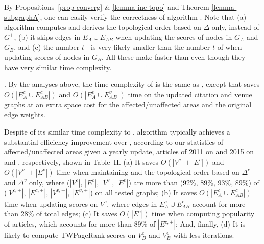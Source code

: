 
By Propositions~\ref{prop-converg} \& \ref{lemma-inc-topo} and Theorem \ref{lemma-subgraphA}, one can easily verify the correctness of algorithm \inctwprscc.
%
Note that  (a) algorithm \inctwprscc computes \sccs and derives the topological order based  on $\Delta$ only, instead of $G^{+}$,
(b) it skips edges in $E_A\cup E_{AB}$ when updating the scores of nodes in $G_A$ and $G_B$, and
(c) the number $t^+$ is very likely smaller than the number $t$ of \twprscc when updating scores of nodes in $G_B$.
%
All these make \inctwprscc faster than \twprscc even though they have very similar time complexity.


.
By the analyses above, the time complexity of \incensemble is the same as \batensemble, except that \incensemble saves $O(|E^c_A\cup E^c_{AB}|)$ and $O(|E^v_A\cup E^v_{AB}|)$ time on the updated citation and venue graphs at an extra space cost for the affected/unaffected areas and the original edge weights.


Despite of its similar time complexity to \batensemble, algorithm \incensemble typically achieves a substantial efficiency improvement over \batensemble, according to our statistics of affected/unaffected areas given a yearly update, \ie articles of 2011 on \aan and 2015 on \aminer and \magdata, respectively, shown in Table~II.
%
(a) It saves $O(|V^c|+|E^c|)$ and $O(|V^v|+|E^v|)$ time when maintaining \sccs and the topological order based on $\Delta^c$ and $\Delta^v$ only, where ($|V^c|$, $|E^c|$, $|V^v|$, $|E^v|$) are more than (92\%, 89\%, 93\%, 89\%) of ($|V^{c,+}|$, $|E^{c,+}|$, $|V^{v,+}|$, $|E^{v,+}|$) on all tested graphs;
(b) It saves $O(|E^c_A \cup E^c_{AB}|)$ time when updating scores on $V^c$, where edges in $E^c_A\cup E^c_{AB}$ account for more than 28\% of total edges;
(c) It saves $O(|E^c|)$ time when computing popularity of articles, which accounts for more than 89\% of $|E^{c,+}|$;
And, finally, (d) It is likely to compute TWPageRank scores on $V^c_B$ and $V^v_B$ with less iterations.



